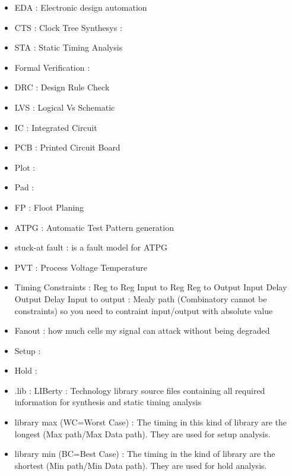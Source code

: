 \documentclass[11pt,a4paper,sans]{report}
\begin{document}
\begin{itemize}
	\item EDA : Electronic design automation
	\item CTS : Clock Tree Synthesys : %
	\item STA : Static Timing Analysis  %

	\item Formal Verification :
	\item DRC : Design Rule Check %
	\item LVS : Logical Vs Schematic %
	\item IC : Integrated Circuit
	\item PCB : Printed Circuit Board
	\item Plot : %
	\item Pad : %
	\item FP : Floot Planing %
	\item ATPG : Automatic Test Pattern generation
	\item stuck-at fault : is a fault model for ATPG %

	\item PVT : Process Voltage Temperature %

	\item Timing Constraints :
		Reg to Reg
		Input to Reg
		Reg to Output
		Input Delay
		Output Delay
		Input to output : Mealy path (Combinatory cannot be constraints) so you need to contraint input/output with absolute value


	\item Fanout : how much cells my signal can attack without being degraded

	\item Setup :
	\item Hold :

	\item .lib : LIBerty : Technology library source files containing all required information for synthesis and static timing analysis

	\item library max (WC=Worst Case) : The timing in this kind of library are the longest (Max path/Max Data path). They are used for setup analysis. 
	\item library min (BC=Best Case) : The timing in the kind of library are the shortest (Min path/Min Data path). They are used for hold analysis.
	


\end{itemize}
\end{document}
